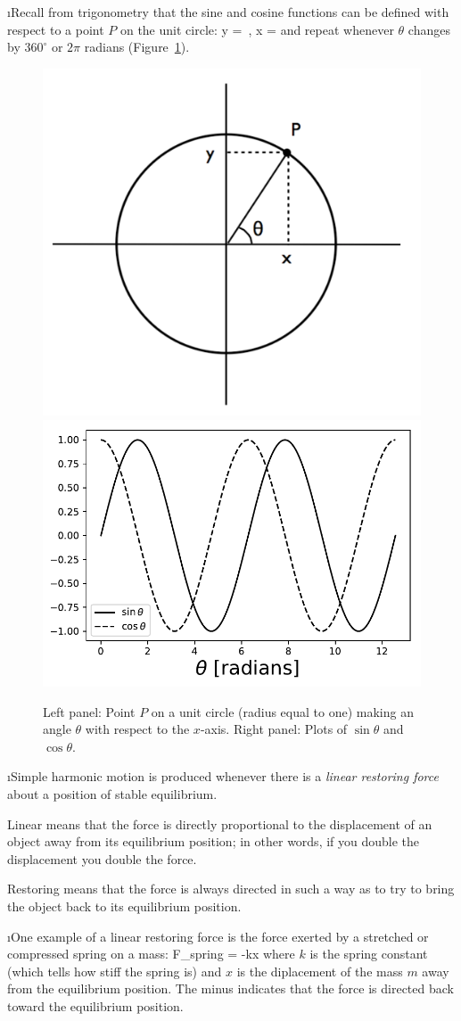 \i Recall from trigonometry that the sine and cosine functions 
can be defined with respect to a point $P$ on the unit circle:
%
\be
y = \sin\theta\,,\qquad
x = \cos\theta
\ee
%
and repeat whenever $\theta$ changes by $360^\circ$ or 
$2\pi$ radians (Figure~\ref{f:sine-cosine}).
%
\begin{figure}[htbp]
\begin{center}
\includegraphics[width=.40\textwidth]{circle-theta}
\includegraphics[width=.45\textwidth]{sine-cosine}
\caption{Left panel:
Point $P$ on a unit circle (radius equal to one)
making an angle $\theta$ with respect
to the $x$-axis.
Right panel: Plots of $\sin\theta$ and $\cos\theta$.}
\label{f:sine-cosine}
\end{center}
\end{figure}
%

\i Simple harmonic motion is produced whenever there is a
{\em linear restoring force} about a position of stable equilibrium.

Linear means that the force is directly proportional to the
displacement of an object away from its equilibrium position;
in other words, if you double the displacement you double the
force.

Restoring means that the force is always directed in such a 
way as to try to bring the object back to its equilibrium 
position.

\i One example of a linear restoring force is the force exerted 
by a stretched or compressed spring on a mass:
%
\be
F_{\rm spring} = -kx
\ee
%
where $k$ is the spring constant (which tells how stiff
the spring is) and $x$ is the diplacement of the mass $m$
away from the equilibrium position.
The minus indicates that the force is directed back toward
the equilibrium position.


